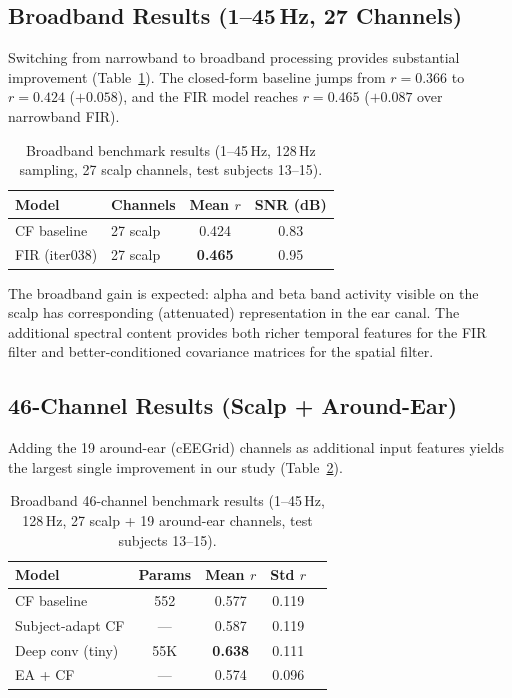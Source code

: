 \documentclass[conference]{IEEEtran}
\begin{document}
\subsection{Broadband Results (1--45\,Hz, 27 Channels)}

Switching from narrowband to broadband processing provides substantial improvement (Table~\ref{tab:broadband}). The closed-form baseline jumps from $r = 0.366$ to $r = 0.424$ ($+0.058$), and the FIR model reaches $r = 0.465$ ($+0.087$ over narrowband FIR).

\begin{table}[t]
\centering
\caption{Broadband benchmark results (1--45\,Hz, 128\,Hz sampling, 27 scalp channels, test subjects 13--15).}
\label{tab:broadband}
\begin{tabular}{@{}llcc@{}}
\toprule
Model & Channels & Mean $r$ & SNR (dB) \\
\midrule
CF baseline & 27 scalp & 0.424 & 0.83 \\
FIR (iter038) & 27 scalp & \textbf{0.465} & 0.95 \\
\bottomrule
\end{tabular}
\end{table}

The broadband gain is expected: alpha and beta band activity visible on the scalp has corresponding (attenuated) representation in the ear canal. The additional spectral content provides both richer temporal features for the FIR filter and better-conditioned covariance matrices for the spatial filter.

\subsection{46-Channel Results (Scalp + Around-Ear)}

Adding the 19 around-ear (cEEGrid) channels as additional input features yields the largest single improvement in our study (Table~\ref{tab:46ch}).

\begin{table}[t]
\centering
\caption{Broadband 46-channel benchmark results (1--45\,Hz, 128\,Hz, 27 scalp + 19 around-ear channels, test subjects 13--15).}
\label{tab:46ch}
\begin{tabular}{@{}lcccc@{}}
\toprule
Model & Params & Mean $r$ & Std $r$ \\
\midrule
CF baseline & 552 & 0.577 & 0.119 \\
Subject-adapt CF & --- & 0.587 & 0.119 \\
Deep conv (tiny) & 55K & \textbf{0.638} & 0.111 \\
EA + CF & --- & 0.574 & 0.096 \\
\bottomrule
\end{tabular}
\end{table}
\end{document}
